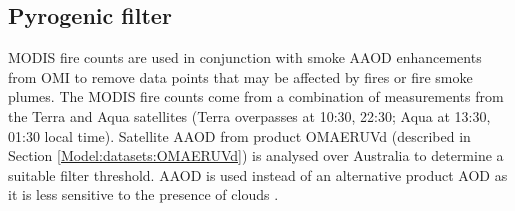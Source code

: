   
  
  
  \subsection{Pyrogenic filter}
    \label{Model:filter:fire}
    
    MODIS fire counts are used in conjunction with smoke AAOD enhancements from OMI to remove data points that may be affected by fires or fire smoke plumes.
    The MODIS fire counts come from a combination of measurements from the Terra and Aqua satellites (Terra overpasses at 10:30, 22:30; Aqua at 13:30, 01:30 local time).
    Satellite AAOD from product OMAERUVd (described in Section \ref{Model:datasets:OMAERUVd}) is analysed over Australia to determine a suitable filter threshold.
    AAOD is used instead of an alternative product AOD as it is less sensitive to the presence of clouds \parencite{Ahn2008}.
    
